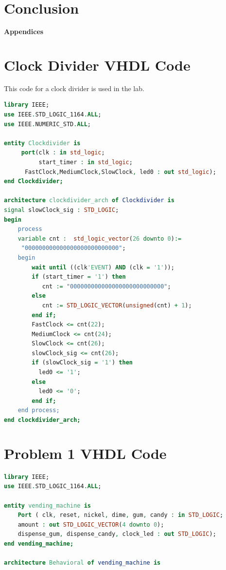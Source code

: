 \documentclass[11pt]{article}
\begin{document}
\section{Conclusion}

\pagebreak

\textbf{Appendices}

\begin{appendices}

\section{Clock Divider VHDL Code}
This code for a clock divider is used in the lab.

\begin{lstlisting}[language=VHDL]
library IEEE;
use IEEE.STD_LOGIC_1164.ALL;
use IEEE.NUMERIC_STD.ALL;

entity Clockdivider is
     port(clk : in std_logic;
          start_timer : in std_logic;
	  FastClock,MediumClock,SlowClock, led0 : out std_logic);
end Clockdivider;

architecture clockdivider_arch of Clockdivider is
signal slowClock_sig : STD_LOGIC;
begin
    process  
    variable cnt :	std_logic_vector(26 downto 0):=
     "000000000000000000000000000";
    begin					 
        wait until ((clk'EVENT) AND (clk = '1'));
		if (start_timer = '1') then
	       cnt := "000000000000000000000000000";
	    else  
           cnt := STD_LOGIC_VECTOR(unsigned(cnt) + 1);
	    end if;
   	    FastClock <= cnt(22);
   	    MediumClock <= cnt(24);	
   	    SlowClock <= cnt(26);
        slowClock_sig <= cnt(26);
        if (slowClock_sig = '1') then
		  led0 <= '1';
	    else
		  led0 <= '0';
	    end if;
	end process;
end clockdivider_arch;
\end{lstlisting}

\section{Problem 1 VHDL Code}

\begin{lstlisting}[language=VHDL]
library IEEE;
use IEEE.STD_LOGIC_1164.ALL;

entity vending_machine is
    Port ( clk, reset, nickel, dime, gum, candy : in STD_LOGIC;
    amount : out STD_LOGIC_VECTOR(4 downto 0);
    dispense_gum, dispense_candy, clock_led : out STD_LOGIC);
end vending_machine;

architecture Behavioral of vending_machine is


\end{lstlisting}
\end{appendices}
\end{document}
